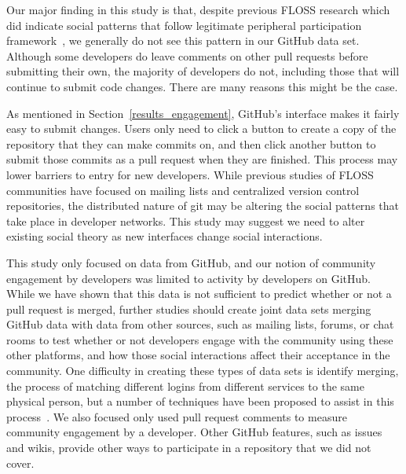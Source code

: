 \documentclass{iitthesis}
\begin{document}
Our major finding in this study is that, despite previous FLOSS research which
did indicate social patterns that follow legitimate peripheral participation
framework~\cite{ducheneaut_socialization_2005, huang_mining_2005, ye_toward_2003},
we generally do not see this pattern in our GitHub data set. Although some
developers do leave comments on other pull requests before submitting their own,
the majority of developers do not, including those that will continue to submit
code changes. There are many reasons this might be the case.

As mentioned in Section~\ref{results_engagement}, GitHub's interface makes it
fairly easy to submit changes. Users only need to click a button to create a
copy of the repository that they can make commits on, and then click another
button to submit those commits as a pull request when they are finished. This
process may lower barriers to entry for new developers. While previous studies
of FLOSS communities have focused on mailing lists and centralized version
control repositories, the distributed nature of git may be altering the social
patterns that take place in developer networks. This study may suggest we need
to alter existing social theory as new interfaces change social interactions.


This study only focused on data from GitHub, and our notion of community
engagement by developers was limited to activity by developers on GitHub. While
we have shown that this data is not sufficient to predict whether or not a pull
request is merged, further studies should create joint data sets merging GitHub
data with data from other sources, such as mailing lists, forums, or chat rooms
to test whether or not developers engage with the community using these other
platforms, and how those social interactions affect their acceptance in the
community. One difficulty in creating these types of data sets is identify
merging, the process of matching different logins from different services to the
same physical person, but a number of techniques have been proposed to assist in
this process~\cite{bird_open_2007, goeminne_comparison_2013, kouters_whos_2012}.
We also focused only used pull request comments to measure community engagement
by a developer. Other GitHub features, such as issues and wikis, provide other
ways to participate in a repository that we did not cover.
\end{document}

